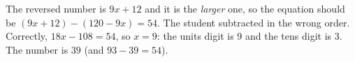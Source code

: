 The reversed number is $9x+12$ and it is the \emph{larger} one, so the equation should be $(9x+12)-(120-9x)=54$. The student subtracted in the wrong order. Correctly, $18x-108=54$, so $x=9$: the units digit is $9$ and the tens digit is $3$. The number is $\boxed{39}$ (and $93-39=54$).
